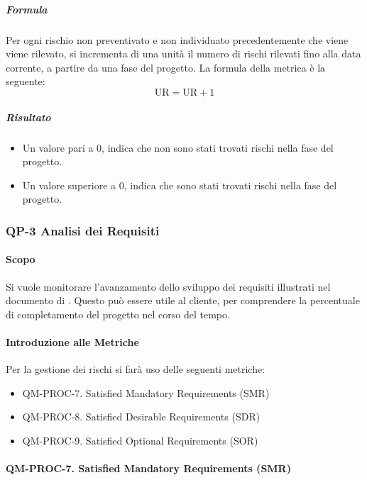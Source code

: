 			\subparagraph{Formula}
			Per ogni rischio non preventivato e non individuato precedentemente che viene viene rilevato, si incrementa di una unità il numero di rischi rilevati fino alla data corrente, a partire da una fase del progetto.
			La formula della metrica è la seguente:
			\[
				\text{UR} = \text{UR} + 1
			\]

			\subparagraph{Risultato}
			\begin{itemize}
				\item Un valore pari a 0, indica che non sono stati trovati rischi nella fase del progetto.
				\item Un valore superiore a 0, indica che sono stati trovati rischi nella fase del progetto.
			\end{itemize}

	\subsubsection{QP-3 Analisi dei Requisiti}

		\paragraph{Scopo}
		
		Si vuole monitorare l'avanzamento dello sviluppo dei requisiti illustrati nel documento di . Questo può essere utile al cliente, per comprendere la percentuale di completamento del progetto nel corso del tempo.

		\paragraph{Introduzione alle Metriche}

		Per la gestione dei rischi si farà uso delle seguenti metriche:

		\begin{itemize}
			\item QM-PROC-7. Satisfied Mandatory Requirements (SMR)
			\item QM-PROC-8. Satisfied Desirable Requirements (SDR)
			\item QM-PROC-9. Satisfied Optional Requirements (SOR)
		\end{itemize}

		\paragraph{QM-PROC-7. Satisfied Mandatory Requirements (SMR)}

